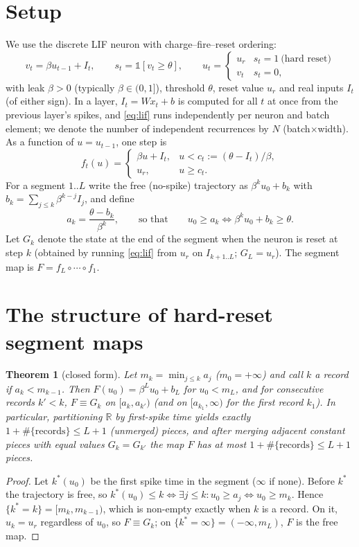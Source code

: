 \documentclass[10pt]{article}
\newtheorem{theorem}{Theorem}
\theoremstyle{remark}
\begin{document}
\section{Setup}

We use the discrete LIF neuron with charge--fire--reset ordering:
\begin{equation}
v_t=\beta u_{t-1}+I_t,\qquad s_t=\mathbb 1[v_t\ge\theta],\qquad u_t=\begin{cases}u_r & s_t=1\ \text{(hard reset)}\\ v_t& s_t=0,\end{cases}
\label{eq:lif}
\end{equation}
with leak $\beta>0$ (typically $\beta\in(0,1]$), threshold $\theta$, reset value $u_r$ and real inputs $I_t$ (of either sign). In a layer, $I_t=Wx_t+b$ is computed for all $t$ at once from the previous layer's spikes, and \eqref{eq:lif} runs independently per neuron and batch element; we denote the number of independent recurrences by $N$ (batch$\times$width). As a function of $u=u_{t-1}$, one step is
\[
f_t(u)=\begin{cases}\beta u+I_t,&u<c_t:=(\theta-I_t)/\beta,\\ u_r,&u\ge c_t.\end{cases}
\]
For a segment $1..L$ write the free (no-spike) trajectory as $\beta^k u_0+b_k$ with $b_k=\sum_{j\le k}\beta^{k-j}I_j$, and define
\[
a_k=\frac{\theta-b_k}{\beta^k},\qquad\text{so that}\qquad u_0\ge a_k\iff \beta^ku_0+b_k\ge\theta .
\]
Let $G_k$ denote the state at the end of the segment when the neuron is reset at step $k$ (obtained by running \eqref{eq:lif} from $u_r$ on $I_{k+1..L}$; $G_L=u_r$). The segment map is $F=f_L\circ\cdots\circ f_1$.

\section{The structure of hard-reset segment maps}
\label{sec:structure}

\begin{theorem}[closed form]
\label{thm:structure}
Let $m_k=\min_{j\le k}a_j$ ($m_0=+\infty$) and call $k$ a \emph{record} if $a_k<m_{k-1}$. Then $F(u_0)=\beta^Lu_0+b_L$ for $u_0<m_L$, and for consecutive records $k'<k$, $F\equiv G_k$ on $[a_k,a_{k'})$ (and on $[a_{k_1},\infty)$ for the first record $k_1$). In particular, partitioning $\mathbb R$ by first-spike time yields exactly $1+\#\{\text{records}\}\le L+1$ (unmerged) pieces, and after merging adjacent constant pieces with equal values $G_k=G_{k'}$ the map $F$ has at most $1+\#\{\text{records}\}\le L+1$ pieces.
\end{theorem}
\begin{proof}
Let $k^*(u_0)$ be the first spike time in the segment ($\infty$ if none). Before $k^*$ the trajectory is free, so $k^*(u_0)\le k\iff\exists j\le k: u_0\ge a_j\iff u_0\ge m_k$. Hence $\{k^*=k\}=[m_k,m_{k-1})$, which is non-empty exactly when $k$ is a record. On it, $u_k=u_r$ regardless of $u_0$, so $F\equiv G_k$; on $\{k^*=\infty\}=(-\infty,m_L)$, $F$ is the free map.
\end{proof}
\end{document}
